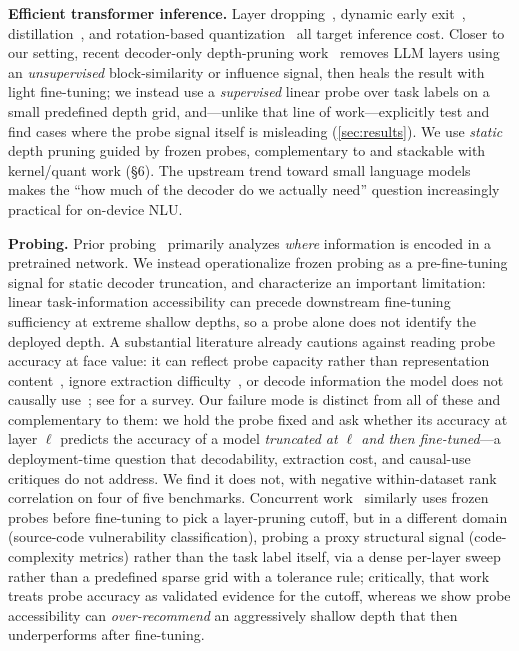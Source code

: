 \documentclass{article}
\begin{document}
\textbf{Efficient transformer inference.} Layer dropping~\citep{fan2020layerdrop},
dynamic early exit~\citep{xin2020deebert}, distillation~\citep{sanh2019distilbert},
and rotation-based quantization~\citep{ashkboos2024quarot} all target inference
cost. Closer to our setting, recent decoder-only depth-pruning
work~\citep{men2024shortgpt,gromov2024unreasonable} removes LLM layers using an
\emph{unsupervised} block-similarity or influence signal, then heals the
result with light fine-tuning; we instead use a \emph{supervised} linear
probe over task labels on a small predefined depth grid, and---unlike that
line of work---explicitly test and find cases where the probe signal itself
is misleading (\cref{sec:results}). We use \emph{static} depth pruning guided
by frozen probes, complementary to and stackable with kernel/quant work (\S6).
The upstream trend toward small
language models~\citep{allal2024smollm,abdin2024phi3} makes the
\enquote{how much of the decoder do we actually need} question
increasingly practical for on-device
NLU.

\textbf{Probing.} Prior probing~\citep{alain2017probes,tenney2019bert} primarily
analyzes \emph{where} information is encoded in a pretrained network. We
instead operationalize frozen probing as a pre-fine-tuning signal for static
decoder truncation, and characterize an important limitation: linear
task-information accessibility can precede downstream fine-tuning sufficiency
at extreme shallow depths, so a probe alone does not identify the deployed
depth. A substantial literature already cautions against reading probe
accuracy at face value: it can reflect probe capacity rather than
representation content~\citep{hewitt2019control}, ignore extraction
difficulty~\citep{voita2020mdl}, or decode information the model does not
causally use~\citep{elazar2021amnesic}; see \citet{belinkov2022probing} for a
survey. Our failure mode is distinct from all of these and complementary to
them: we hold the probe fixed and ask whether its accuracy at layer $\ell$
predicts the accuracy of a model \emph{truncated at $\ell$ and then
fine-tuned}---a deployment-time question that decodability, extraction cost,
and causal-use critiques do not address. We find it does not, with negative
within-dataset rank correlation on four of five benchmarks. Concurrent
work~\citep{ibanezlissen2025lpass}
similarly uses frozen probes before fine-tuning to pick a layer-pruning
cutoff, but in a different domain (source-code vulnerability classification),
probing a proxy structural signal (code-complexity metrics) rather than the
task label itself, via a dense per-layer sweep rather than a predefined sparse
grid with a tolerance rule; critically, that work treats probe accuracy as
validated evidence for the cutoff, whereas we show probe accessibility can
\emph{over-recommend} an aggressively shallow depth that then underperforms
after fine-tuning.
\end{document}
